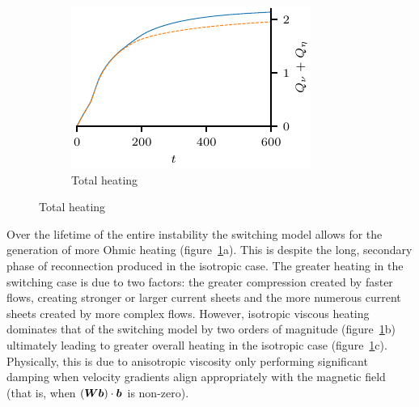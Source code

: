 \begin{figure}[t]
\begin{subfigure}[t]{0.32\textwidth}
      \includegraphics[width=\textwidth]{total_heating_over_time.pdf}
      \caption{Total heating}
    \end{subfigure}
    \label{fig:heating}
\end{figure}

Over the lifetime of the entire instability the switching model allows for the generation of more Ohmic heating (figure~\ref{fig:heating}a). This is despite the long, secondary phase of reconnection produced in the isotropic case. The greater heating in the switching case is due to two factors: the greater compression created by faster flows, creating stronger or larger current sheets and the more numerous current sheets created by more complex flows. However, isotropic viscous heating dominates that of the switching model by two orders of magnitude (figure~\ref{fig:heating}b) ultimately leading to greater overall heating in the isotropic case (figure~\ref{fig:heating}c). Physically, this is due to anisotropic viscosity only performing significant damping when velocity gradients align appropriately with the magnetic field (that is, when $({\bm W} {\bm b}) \cdot {\bm b}$ is non-zero). 

